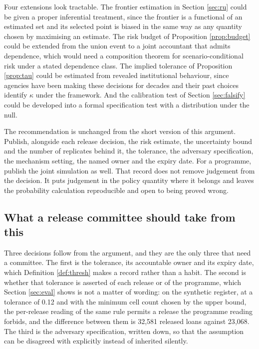 \documentclass[11pt,a4paper]{article}
\theoremstyle{plain}
\theoremstyle{definition}
\begin{document}
Four extensions look tractable. The frontier estimation in Section
\ref{sec:ru} could be given a proper inferential treatment, since the frontier is a functional of an estimated set and its selected point
is biased in the same way as any quantity chosen by maximising an estimate. The risk budget of Proposition
\ref{prop:budget} could be extended from the union event to a joint accountant
that admits dependence, which would need a composition theorem for
scenario-conditional risk under a stated dependence class. The implied tolerance
of Proposition \ref{prop:tau} could be estimated from revealed institutional
behaviour, since agencies have been making these decisions for decades and
their past choices identify $\kappa$ under the framework. And the calibration
test of Section \ref{sec:falsify} could be developed into a formal
specification test with a distribution under the null.

The recommendation is unchanged from the short version of this argument. Publish, alongside each release decision, the risk
estimate, the uncertainty bound and the number of replicates behind it, the
tolerance, the adversary specification, the mechanism setting, the named owner
and the expiry date. For a programme, publish the joint simulation as well. That
record does not remove judgement from the decision. It puts judgement in the
policy quantity where it belongs and leaves the probability calculation
reproducible and open to being proved wrong.

\subsection{What a release committee should take from this}

Three decisions follow from the argument, and they are the only three that need a
committee. The first is the tolerance, its accountable owner and its expiry date,
which Definition \ref{def:thresh} makes a record rather than a habit. The
second is whether that tolerance is asserted of each release or of the programme,
which Section \ref{sec:eval} shows is not a matter of wording: on the synthetic
register, at a tolerance of 0.12 and with the minimum cell count chosen by the
upper bound, the per-release reading of the same rule permits a release the
programme reading forbids, and the difference between them is
32{,}581 released loans against 23{,}068. The
third is the adversary specification, written down, so that the assumption can be
disagreed with explicitly instead of inherited silently.
\end{document}
